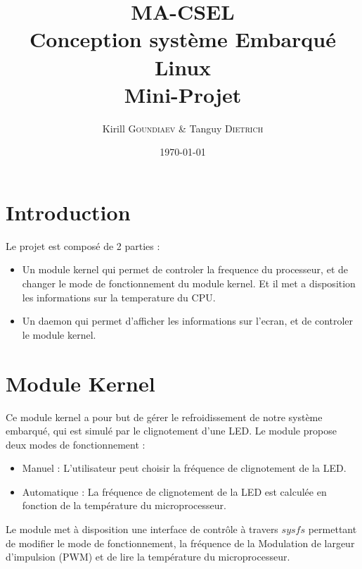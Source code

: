 \documentclass[
	a4paper, %
	10pt, %
]{CSUniSchoolLabReport}
\title{MA-CSEL \\ Conception système Embarqué Linux \\ Mini-Projet } %
\author{Kirill \textsc{Goundiaev} \& Tanguy \textsc{Dietrich}} %
\date{\today} %
\begin{document}
\maketitle %

\begin{figure}[H] %
\label{fig:speciation}
\end{figure}


\newpage

\tableofcontents
\newpage

\section{Introduction}\label{Introduction}
Le projet est composé de 2 parties : \\
\begin{itemize}
	\item Un module kernel qui permet de controler la frequence du processeur, et de changer le mode de fonctionnement du module kernel. Et il met a disposition les informations sur la temperature du CPU.
	\item Un daemon qui permet d'afficher les informations sur l'ecran, et de controler le module kernel.
\end{itemize}


\section{Module Kernel}\label{ModuleKernel}
Ce module kernel a pour but de gérer le refroidissement de notre système embarqué, qui est simulé par le clignotement d'une LED. Le module propose deux modes de fonctionnement :
\begin{itemize}
	\item Manuel : L'utilisateur peut choisir la fréquence de clignotement de la LED.
	\item Automatique : La fréquence de clignotement de la LED est calculée en fonction de la température du microprocesseur.
\end{itemize}

Le module met à disposition une interface de contrôle à travers $sysfs$ permettant de modifier le mode de fonctionnement, la fréquence de la Modulation de largeur d'impulsion (PWM) et de lire la température du microprocesseur. \\
\end{document}
